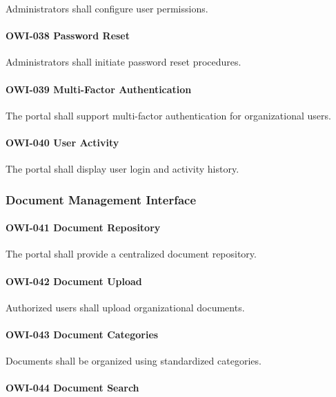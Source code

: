 Administrators shall configure user permissions.

\paragraph{OWI-038 Password Reset}

Administrators shall initiate password reset procedures.

\paragraph{OWI-039 Multi-Factor Authentication}

The portal shall support multi-factor authentication for organizational
users.

\paragraph{OWI-040 User Activity}

The portal shall display user login and activity history.


\subsubsection*{Document Management Interface}

\paragraph{OWI-041 Document Repository}

The portal shall provide a centralized document repository.

\paragraph{OWI-042 Document Upload}

Authorized users shall upload organizational documents.

\paragraph{OWI-043 Document Categories}

Documents shall be organized using standardized categories.

\paragraph{OWI-044 Document Search}

